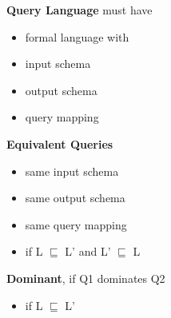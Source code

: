 \documentclass{article}
\begin{document}
		\textbf{Query Language} must have
		\begin{itemize}
			\item formal language with
			\item input schema
			\item output schema
			\item query mapping
		\end{itemize}

		\textbf{Equivalent Queries}
		\begin{itemize}
			\item same input schema
			\item same output schema
			\item same query mapping
			\item if L $\sqsubseteq$ L' and L' $\sqsubseteq$ L
		\end{itemize}

		\textbf{Dominant}, if Q1 dominates Q2
		\begin{itemize}
			\item if L $\sqsubseteq$ L'
		\end{itemize}
\end{document}

